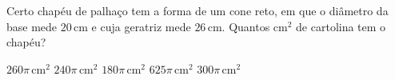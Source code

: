 Certo chapéu de palhaço tem a forma de um cone reto, em que o diâmetro da base mede $20$\,cm e cuja geratriz mede $26$\,cm. Quantos cm$^2$ de cartolina tem o chapéu?

$260\pi$\,cm$^2$
$240\pi$\,cm$^2$
$180\pi$\,cm$^2$
$625\pi$\,cm$^2$
$300\pi$\,cm$^2$




